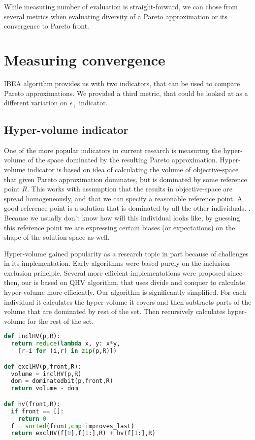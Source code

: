 \documentclass[12pt,oneside]{fithesis2}
\begin{document}
While measuring number of evaluation is straight-forward, we can chose from several metrics when evaluating diversity of a Pareto approximation or its convergence to Pareto front. 

\section{Measuring convergence}
IBEA algorithm provides us with two indicators, that can be used to compare Pareto approximations. We provided a third metric, that could be looked at as a different variation on $\epsilon_+$ indicator.

\subsection{Hyper-volume indicator}
One of the more popular indicators in current research is measuring the hyper-volume of the space dominated by the resulting Pareto approximation. Hyper-volume indicator is based on idea of calculating the volume of objective-space that given Pareto approximation dominates, but is dominated by some reference point $R$. This works with assumption that the results in objective-space are spread homogeneously, and that we can specify a reasonable reference point. A good reference point is a solution that is dominated by all the other individuals. \cite{auger2009theory}. Because we usually don't know how will this individual looks like, by guessing this reference point we are expressing certain biases (or expectations) on the shape of the solution space as well.

Hyper-volume gained popularity as a research topic in part because of challenges in its implementation. Early algorithms were based purely on the inclusion-exclusion principle\cite{wu2001metrics}. Several more efficient implementations were proposed since then, our is based on QHV algorithm\cite{russo2012quick}, that uses divide and conquer to calculate hyper-volume more efficiently. Our algorithm is significantly simplified. For each individual it calculates the hyper-volume it covers and then subtracts parts of the volume that are dominated by rest of the set. Then recursively calculates hyper-volume for the rest of the set.

\begin{lstlisting}[language=Python,label=eps_example,caption=Hypervolume indicator implementation]
def inclHV(p,R):
  return reduce(lambda x, y: x*y,
    [r-i for (i,r) in zip(p,R)])

def exclHV(p,front,R):
  volume = inclHV(p,R)
  dom = dominatedbit(p,front,R)
  return volume - dom

def hv(front,R):
  if front == []:
    return 0
  f = sorted(front,cmp=improves_last) 
  return exclHV(f[0],f[1:],R) + hv(f[1:],R)
\end{lstlisting}
\end{document}
